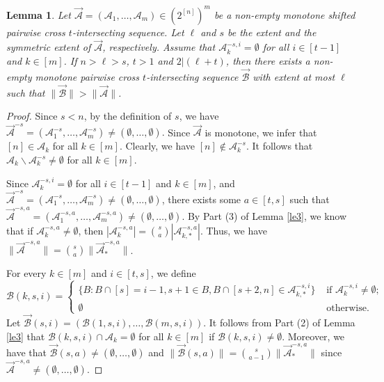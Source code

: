 \documentclass[11pt,a4paper]{article}
\newtheorem{lemma}[theorem]{Lemma}
\begin{document}
\begin{lemma}\label{le5}
Let $\vec{\mathcal{A}} = (\mathcal{A}_1, \ldots, \mathcal{A}_m) \in (2^{[n]})^{m}$ be  a non-empty monotone shifted pairwise cross $t$-intersecting  sequence. Let $\ell$ and   $s$ be  the extent and the symmetric extent of $\vec{\mathcal{A}}$, respectively. Assume that  $\mathcal{A}_{k}^{-s, i}=\emptyset$ for all $i\in [t-1]$ and $k\in [m]$. If $n>\ell>s$, $t>1$ and $2|(\ell+t)$,   then there exists a non-empty monotone pairwise cross $t$-intersecting sequence $\vec{\mathcal{B}}$  with  extent at most $\ell$ such that $\|\vec{\mathcal{B}}\|>\|\vec{\mathcal{A}}\|$.
\end{lemma} 
\begin{proof}
Since $s<n$, by the definition of $s$, we have 
$\vec{\mathcal{A}}^{-s} = (\mathcal{A}_1^{-s}, \ldots, \mathcal{A}_m^{-s})\neq (\emptyset,\ldots, \emptyset).$ Since  $\vec{\mathcal{A}}$ is monotone, we infer that $[n]\in \mathcal{A}_k$ for all $k\in [m]$. Clearly, we have $[n]\notin \mathcal{A}_k^{-s}$.
It follows that $\mathcal{A}_k\backslash \mathcal{A}_k^{-s}\neq \emptyset$ for all $k\in [m]$.



 Since $\mathcal{A}_{k}^{-s, i}=\emptyset$ for all $i\in [t-1]$ and $k\in [m]$, and $\vec{\mathcal{A}}^{-s} = (\mathcal{A}_1^{-s}, \ldots, \mathcal{A}_m^{-s})\neq (\emptyset,\ldots, \emptyset)$, 
 there exists some $a\in [t,s]$ such that 
$\vec{\mathcal{A}}^{-s,a} = (\mathcal{A}_1^{-s,a}, \ldots, \mathcal{A}_m^{-s,a})\neq (\emptyset,\ldots, \emptyset)$.
By Part (3) of Lemma \ref{le3}, we know that if $\mathcal{A}_{k}^{-s, a}\neq \emptyset$, then
$|\mathcal{A}_{k}^{-s, a}|=\binom{s}{a}|\mathcal{A}_{k,*}^{-s, a}|$. 
Thus, we have
$\|\vec{\mathcal{A}}^{-s,a}\|=\binom{s}{a}\|\vec{\mathcal{A}}_*^{-s,a}\|$.


For every $k\in [m]$ and $i\in [t,s]$, we define
$$
\mathcal{B}(k,s, i)=
 \begin{cases} \{B: B\cap [s]=i-1, s+1\in B, B\cap [s+2,n]\in \mathcal{A}_{k,*}^{-s, i} \} & \text { if }  \mathcal{A}_{k}^{-s, i}\neq \emptyset; \\ \emptyset & \text { otherwise. }\end{cases}
$$
Let $\vec{\mathcal{B}}(s,i) = (\mathcal{B}(1,s, i), \ldots, \mathcal{B}(m,s, i))$.
It follows from Part (2) of Lemma \ref{le3} 
that $\mathcal{B}(k,s, i)\cap \mathcal{A}_{k}=\emptyset$ for all $k\in[m]$ if $\mathcal{B}(k,s, i)\neq \emptyset$. Moreover, we have that $\vec{\mathcal{B}}(s,a)\neq (\emptyset,\ldots, \emptyset)$ and $\|\vec{\mathcal{B}}(s,a)\|=\binom{s}{a-1}\|\vec{\mathcal{A}}_*^{-s,a}\|$ since $\vec{\mathcal{A}}^{-s,a} \neq (\emptyset,\ldots, \emptyset)$. 


\end{proof}
\end{document}
